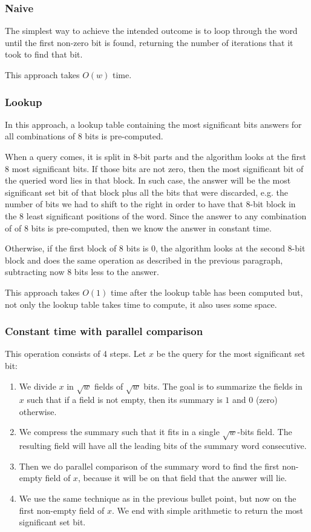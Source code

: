 \subsubsection{Naive}

The simplest way to achieve the intended outcome is to loop through the word until the first non-zero bit is found, returning the number of iterations that it took to find that bit.

This approach takes $O(w)$ time.

\subsubsection{Lookup}

In this approach, a lookup table containing the most significant bits answers for all combinations of 8 bits is pre-computed.

When a query comes, it is split in 8-bit parts and the algorithm looks at the first 8 most significant bits. If those bits are not zero, then the most significant bit of the queried word lies in that block. In such case, the answer will be the most significant set bit of that block plus all the bits that were discarded, e.g. the number of bits we had to shift to the right in order to have that 8-bit block in the 8 least significant positions of the word. Since the answer to any combination of of 8 bits is pre-computed, then we know the answer in constant time.

Otherwise, if the first block of 8 bits is 0, the algorithm looks at the second 8-bit block and does the same operation as described in the previous paragraph, subtracting now 8 bits less to the answer.

This approach takes $O(1)$ time after the lookup table has been computed but, not only the lookup table takes time to compute, it also uses some space.

\subsubsection{Constant time with parallel comparison}

This operation consists of 4 steps. Let $x$ be the query for the most significant set bit:
\begin{enumerate}
    \item
    We divide $x$ in $\sqrt{w}$ fields of $\sqrt{w}$ bits. The goal is to summarize the fields in $x$ such that if a field is not empty, then its summary is $1$ and $0$  (zero) otherwise.
    \item
    We compress the summary such that it fits in a single $\sqrt{w}$-bits field. The resulting field will have all the leading bits of the summary word consecutive.
    \item
    Then we do parallel comparison of the summary word to find the first non-empty field of $x$, because it will be on that field that the answer will lie.
    \item
    We use the same technique as in the previous bullet point, but now on the first non-empty field of $x$. We end with simple arithmetic to return the most significant set bit. 
\end{enumerate}

